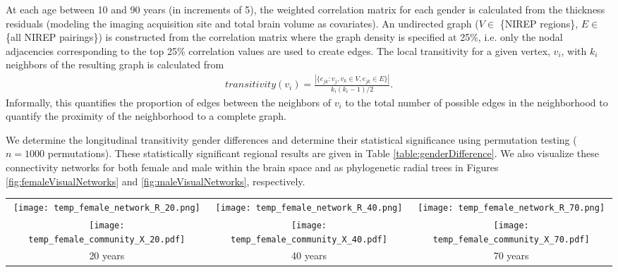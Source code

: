 At each age between 10 and 90 years (in increments of 5), the weighted correlation
matrix for each gender is calculated from the thickness residuals 
(modeling the imaging acquisition site and total brain volume as covariates).  An undirected graph ($V \in$ \{NIREP regions\}, $E \in$ \{all NIREP pairings\})
is constructed from the correlation matrix where the graph density is specified at 25\%, i.e. only the nodal adjacencies corresponding to the top 25\% correlation values are used to create edges.    The local transitivity for a given vertex, $v_i$, with $k_i$ neighbors of the resulting graph is calculated from
\begin{align}
  transitivity(v_i) = \frac{|\{e_{jk}: v_j, v_k \in V, e_{jk} \in E \}|}{k_i (k_i-1)/2}.
\end{align}
Informally, this quantifies the proportion of edges between the neighbors of $v_i$ to the total number of possible edges in the neighborhood to quantify the proximity of the neighborhood to a complete graph.  

We determine the longitudinal transitivity gender differences and determine their
statistical significance using permutation testing ($n = 1000$ permutations).  These statistically significant regional results are given in Table \ref{table:genderDifference}.  
We also visualize these connectivity networks for both female and male within the brain
space and as phylogenetic radial trees in Figures \ref{fig:femaleVisualNetworks} and \ref{fig:maleVisualNetworks}, respectively.

\begin{figure*}[htb]
  \centering
  \begin{tabular}{ccc}
  \texttt{[image: temp\_female\_network\_R\_20.png]} &
  \texttt{[image: temp\_female\_network\_R\_40.png]} &
  \texttt{[image: temp\_female\_network\_R\_70.png]} \\
  \texttt{[image: temp\_female\_community\_X\_20.pdf]} &
  \texttt{[image: temp\_female\_community\_X\_40.pdf]} &
  \texttt{[image: temp\_female\_community\_X\_70.pdf]} \\
  20 years & 40 years & 70 years 
  \end{tabular}
  \caption{Visual illustration of the female thickness networks for ages 20, 40, 
  and 70 years.  Community relationships between regions are depicted both in 
  brain space (top row) and as a radial phylogenetic tree where colors denote 
  neighborhoods (bottom row).
  }
  \label{fig:femaleVisualNetworks}
\end{figure*}

